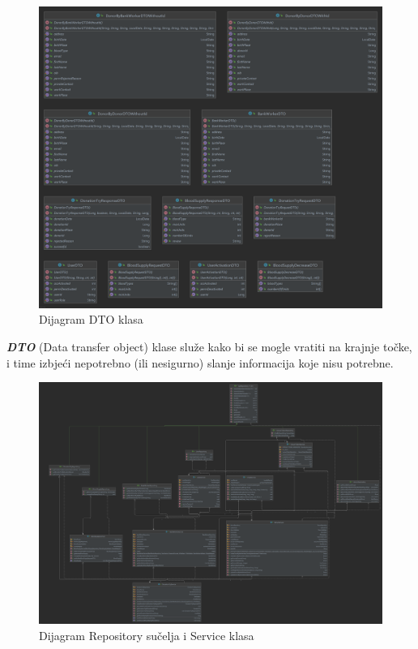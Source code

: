     \begin{figure}[H]
        \includegraphics[scale=0.16]{slike/DTO.png}
		\centering
		\caption{Dijagram DTO klasa}
		\label{fig:DTO}
    \end{figure}
    \textbf{\textit{DTO}} (Data transfer object) klase služe kako bi se mogle vratiti na krajnje točke, i time izbjeći nepotrebno (ili nesigurno) slanje informacija koje nisu potrebne.
    
    
    \begin{figure}[H]
        \includegraphics[scale=0.064]{slike/RepositoryService.png}
		\centering
		\caption{Dijagram Repository sučelja i Service klasa}
		\label{fig:repositoryService}
    \end{figure}
    
